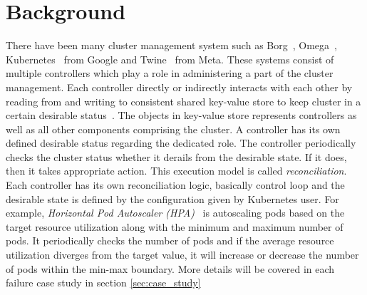 \section{Background}
\label{sec:background}

There have been many cluster management system such as Borg~\cite{borg}, Omega~\cite{omega}, Kubernetes~\cite{kubernetes} from Google and Twine~\cite{twine} from Meta. These systems consist of multiple controllers which play a role in administering a part of the cluster management. Each controller directly or indirectly interacts with each other by reading from and writing to consistent shared key-value store to keep cluster in a certain desirable status~\cite{etcd, zookeeper}. The objects in key-value store represents controllers as well as all other components comprising the cluster.
A controller has its own defined desirable status regarding the dedicated role. The controller periodically checks the cluster status whether it derails from the desirable state. If it does, then it takes appropriate action. This execution model is called \textit{reconciliation}. Each controller has its own reconciliation logic, basically control loop and the desirable state is defined by the configuration given by Kubernetes user. 
For example, \textit{Horizontal Pod Autoscaler (HPA)}~\cite{hpa} is autoscaling pods based on the target resource utilization along with the minimum and maximum number of pods. It periodically checks the number of pods and if the average resource utilization diverges from the target value, it will increase or decrease the number of pods within the min-max boundary.
More details will be covered in each failure case study in section \ref{sec:case_study}